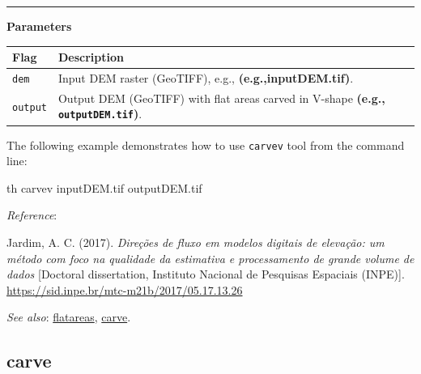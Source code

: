 \documentclass[
]{book}
\newenvironment{Shaded}{\begin{snugshade}}{\end{snugshade}}
\newcommand{\ExtensionTok}[1]{#1}
\newcommand{\NormalTok}[1]{#1}
\theoremstyle{definition}
\theoremstyle{definition}
\theoremstyle{definition}
\theoremstyle{definition}
\theoremstyle{remark}
\begin{document}
\begin{center}\rule{0.5\linewidth}{0.5pt}\end{center}

\textbf{Parameters}

\begin{longtable}[]{@{}
  >{\raggedright\arraybackslash}p{}
  >{\raggedright\arraybackslash}p{}@{}}
\toprule\noalign{}
\begin{minipage}[b]{\linewidth}\raggedright
Flag
\end{minipage} & \begin{minipage}[b]{\linewidth}\raggedright
Description
\end{minipage} \\
\midrule\noalign{}
\endhead
\bottomrule\noalign{}
\endlastfoot
\texttt{dem} & Input DEM raster (GeoTIFF), e.g., \textbf{(e.g.,inputDEM.tif)}. \\
\texttt{output} & Output DEM (GeoTIFF) with flat areas carved in V-shape \textbf{(e.g., \texttt{outputDEM.tif})}. \\
\end{longtable}

The following example demonstrates how to use \texttt{carvev} tool from the command line:

\begin{Shaded}
\begin{Highlighting}[]
\ExtensionTok{th}\NormalTok{ carvev inputDEM.tif outputDEM.tif}
\end{Highlighting}
\end{Shaded}

\emph{Reference}:

Jardim, A. C. (2017). \emph{Direções de fluxo em modelos digitais de elevação: um método com foco na qualidade da estimativa e processamento de grande volume de dados} {[}Doctoral dissertation, Instituto Nacional de Pesquisas Espaciais (INPE){]}. \href{http://mtc-m21b.sid.inpe.br/col/sid.inpe.br/mtc-m21b/2017/05.17.13.26/doc/publicacao.pdf?metadatarepository=sid.inpe.br/mtc-m21b/2017/05.17.13.26.57&mirror=sid.inpe.br/mtc-m21b/2013/09.26.14.25.22&languagebutton=en}{https://sid.inpe.br/mtc-m21b/2017/05.17.13.26}

\emph{See also}: \hyperref[flatareas]{flatareas}, \hyperref[carve]{carve}.

\subsection{carve}\label{carve}
\end{document}
